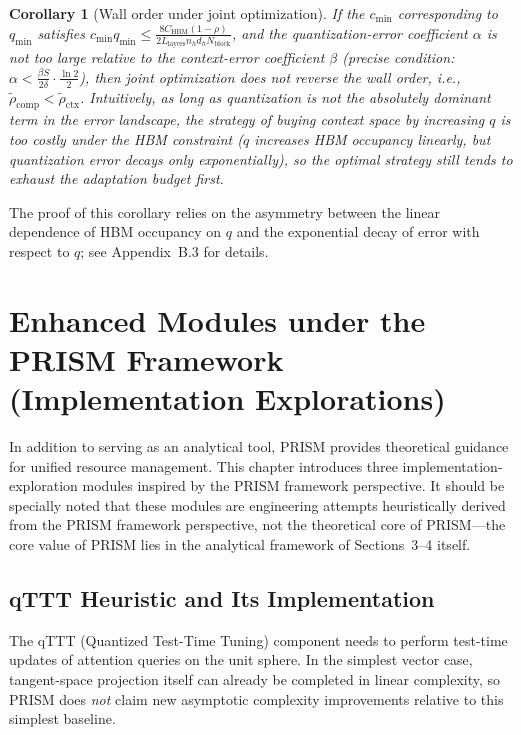 \documentclass[11pt,a4paper]{article}
\theoremstyle{plain}
\newtheorem{corollary}{Corollary}
\theoremstyle{definition}
\begin{document}
\begin{corollary}[Wall order under joint optimization]\label{cor:joint}
If the $c_{\min}$ corresponding to $q_{\min}$ satisfies $c_{\min} q_{\min} \leq \frac{8 C_{\text{HBM}}(1-\rho)}{2 L_{\text{layers}} n_h d_h N_{\text{block}}}$, and the quantization-error coefficient $\alpha$ is not too large relative to the context-error coefficient $\beta$ (precise condition: $\alpha < \frac{\beta S}{2\delta} \cdot \frac{\ln 2}{2}$), then joint optimization does not reverse the wall order, i.e., $\tilde{\rho}_{\text{comp}} < \tilde{\rho}_{\text{ctx}}$. Intuitively, as long as quantization is not the absolutely dominant term in the error landscape, the strategy of buying context space by increasing $q$ is too costly under the HBM constraint ($q$ increases HBM occupancy linearly, but quantization error decays only exponentially), so the optimal strategy still tends to exhaust the adaptation budget first.
\end{corollary}

The proof of this corollary relies on the asymmetry between the linear dependence of HBM occupancy on $q$ and the exponential decay of error with respect to $q$; see Appendix~B.3 for details.

\section{Enhanced Modules under the PRISM Framework (Implementation Explorations)}

In addition to serving as an analytical tool, PRISM provides theoretical guidance for unified resource management. This chapter introduces three implementation-exploration modules inspired by the PRISM framework perspective. It should be specially noted that these modules are engineering attempts heuristically derived from the PRISM framework perspective, not the theoretical core of PRISM---the core value of PRISM lies in the analytical framework of Sections~3--4 itself.

\subsection{qTTT Heuristic and Its Implementation}

The qTTT (Quantized Test-Time Tuning) component needs to perform test-time updates of attention queries on the unit sphere. In the simplest vector case, tangent-space projection itself can already be completed in linear complexity, so PRISM does \emph{not} claim new asymptotic complexity improvements relative to this simplest baseline.
\end{document}
